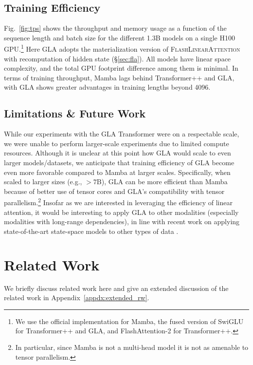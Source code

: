 \subsection{Training Efficiency}
\vspace{-2mm}

Fig.~\ref{fig:tps} shows the throughput and memory usage as a function of the sequence length and batch size for the different 1.3B models on a single H100 GPU.\footnote{We use the official implementation for Mamba, the fused version of SwiGLU  for Transformer++ and GLA, and FlashAttention-2 for Transformer++.} Here GLA adopts the materialization version of \textsc{FlashLinearAttention} with recomputation of hidden state (\S\ref{sec:fla}). All models have linear space complexity, and the total GPU footprint difference among them is minimal. In terms of training throughput, Mamba  lags behind Transformer++ and GLA, with GLA shows greater advantages in training lengths beyond 4096.

\vspace{-2mm}
\subsection{Limitations \& Future Work}
\vspace{-2mm}
While our experiments with the GLA Transformer were on a respectable scale, we were unable to perform larger-scale experiments due to limited compute resources.
Although it is unclear at this point how GLA would scale to even larger models/datasets, we anticipate that training efficiency of GLA become even more favorable compared to Mamba at larger scales. Specifically, when scaled to larger sizes (e.g., $>7$B), GLA can be more efficient than Mamba because of better use of tensor cores and GLA's compatibility with tensor parallelism.\footnote{In particular, since Mamba is not a  multi-head model it is not as amenable to tensor parallelism.} Insofar as we are interested in leveraging the efficiency of linear attention, it would be interesting to apply GLA to other modalities (especially modalities with long-range dependencies), in line with recent work on applying state-of-the-art state-space models to other types of data \citep[][\textit{inter alia}]{Yan2023DiffusionMW, zhu2024vision,ma2024u,liu2024vmamba,xing2024segmamba,wang2024graph,wang2024mambabyte,yang2024vivim}.

\vspace{-2mm}
\section{Related Work}
\label{sec:related}
\vspace{-2mm}
We briefly discuss related work here and give an extended discussion of the related work in Appendix~\ref{appdx:extended_rw}.

